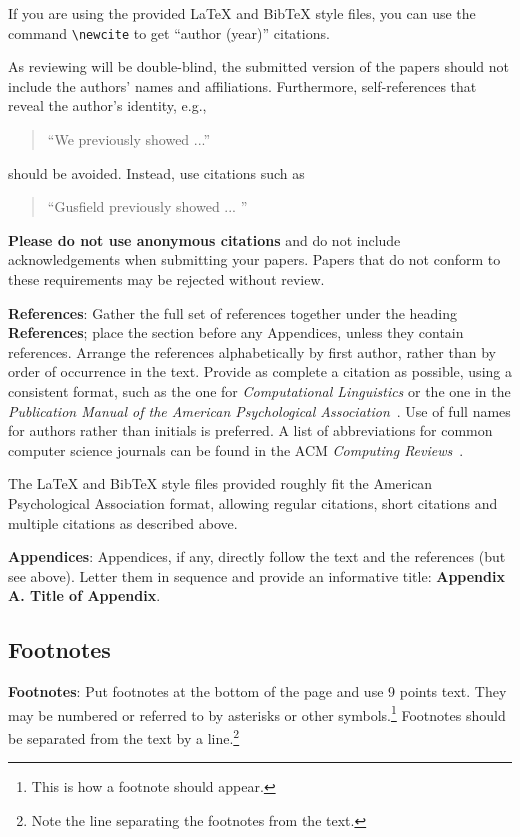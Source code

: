 \documentclass[11pt]{article}
\begin{document}
If you are using the provided \LaTeX{} and Bib\TeX{} style files, you
can use the command \verb|\newcite| to get ``author (year)'' citations.

As reviewing will be double-blind, the submitted version of the papers
should not include the authors' names and affiliations. Furthermore,
self-references that reveal the author's identity, e.g.,
\begin{quote}
``We previously showed \cite{Gusfield:97} ...''  
\end{quote}
should be avoided. Instead, use citations such as 
\begin{quote}
``Gusfield 
previously showed ... ''
\end{quote}

\textbf{Please do not use anonymous citations} and do not include
acknowledgements when submitting your papers. Papers that do not
conform to these requirements may be rejected without review.

\textbf{References}: Gather the full set of references together under
the heading {\bf References}; place the section before any Appendices,
unless they contain references. Arrange the references alphabetically
by first author, rather than by order of occurrence in the text.
Provide as complete a citation as possible, using a consistent format,
such as the one for {\em Computational Linguistics\/} or the one in the 
{\em Publication Manual of the American 
Psychological Association\/}~\cite{APA:83}.  Use of full names for
authors rather than initials is preferred.  A list of abbreviations
for common computer science journals can be found in the ACM 
{\em Computing Reviews\/}~\cite{ACM:83}.

The \LaTeX{} and Bib\TeX{} style files provided roughly fit the
American Psychological Association format, allowing regular citations, 
short citations and multiple citations as described above.

{\bf Appendices}: Appendices, if any, directly follow the text and the
references (but see above).  Letter them in sequence and provide an
informative title: {\bf Appendix A. Title of Appendix}.

\subsection{Footnotes}

{\bf Footnotes}: Put footnotes at the bottom of the page and use 9
points text. They may be numbered or referred to by asterisks or other
symbols.\footnote{This is how a footnote should appear.} Footnotes
should be separated from the text by a line.\footnote{Note the line
separating the footnotes from the text.}
\end{document}
